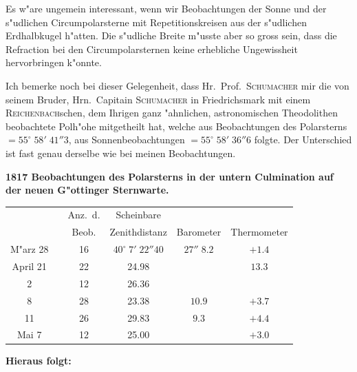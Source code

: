 \documentclass[12pt,a4paper]{article}
\begin{document}
Es w"are ungemein interessant, wenn wir Beobachtungen der Sonne und der s"udlichen Circumpolarsterne
mit Repetitionskreisen aus der s"udlichen Erdhalbkugel h"atten. Die s"udliche Breite m"usste aber so gross
sein, dass die Refraction bei den Circumpolarsternen keine erhebliche Ungewissheit hervorbringen k"onnte.

Ich bemerke noch bei dieser Gelegenheit, dass Hr.~Prof.~\textsc{Schumacher} mir die von seinem Bruder,
Hrn.~Capitain \textsc{Schumacher} in Friedrichsmark mit einem \textsc{Reichenbach}schen, dem Ihrigen ganz "ahnlichen,
astronomischen Theodolithen beobachtete Polh"ohe mitgetheilt hat, welche aus Beobachtungen des
Polarsterns $= 55^{\circ}\;58'\;41''3$, aus Sonnenbeobachtungen $= 55^{\circ}\;58'\;36''6$ folgte. Der Unterschied ist fast
genau derselbe wie bei meinen Beobachtungen.

\vspace{1em}

\textbf{1817 Beobachtungen des Polarsterns in der untern Culmination auf der neuen G"ottinger Sternwarte.}

\begin{center}
\begin{tabular}{c|c|c|c|c|c}
\toprule
& & Anz.~d. & Scheinbare & & \\
& & Beob. & Zenithdistanz & Barometer & Thermometer \\
\midrule
M"arz 28 & & 16 & $40^{\circ}\;7'\;22''40$ & $27''\;8.2$ & $+1.4$ \\
April 21 & & 22 & \phantom{0}\phantom{0}\phantom{0}\phantom{0}\phantom{0}\phantom{0}24.98 & & $13.3$ \\
\phantom{21} 2 & & 12 & \phantom{0}\phantom{0}\phantom{0}\phantom{0}\phantom{0}\phantom{0}26.36 & & \\
\phantom{21} 8 & & 28 & \phantom{0}\phantom{0}\phantom{0}\phantom{0}\phantom{0}\phantom{0}23.38 & $10.9$ & $+3.7$ \\
\phantom{21} 11 & & 26 & \phantom{0}\phantom{0}\phantom{0}\phantom{0}\phantom{0}\phantom{0}29.83 & $9.3$ & $+4.4$ \\
Mai \phantom{0}7 & & 12 & \phantom{0}\phantom{0}\phantom{0}\phantom{0}\phantom{0}\phantom{0}25.00 & & $+3.0$ \\
\bottomrule
\end{tabular}
\end{center}

\begin{center}
\textbf{Hieraus folgt:}
\end{center}
\end{document}
